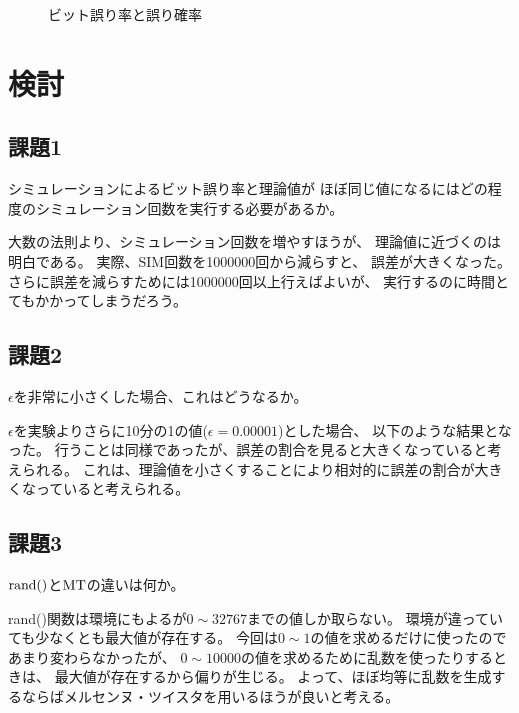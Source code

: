 \documentclass[12pt]{jarticle}
\begin{document}
\begin{figure}[h]
    \begin{center}
    \end{center}
    \caption{ビット誤り率と誤り確率}
\end{figure}

\section{検討}
\subsection{課題1}
\begin{shadebox}
    シミュレーションによるビット誤り率と理論値が
    ほぼ同じ値になるにはどの程度のシミュレーション回数を実行する必要があるか。
\end{shadebox}

大数の法則より、シミュレーション回数を増やすほうが、
理論値に近づくのは明白である。
実際、SIM回数を1000000回から減らすと、
誤差が大きくなった。
さらに誤差を減らすためには1000000回以上行えばよいが、
実行するのに時間とてもかかってしまうだろう。

\subsection{課題2}
\begin{shadebox}
    $\epsilon$を非常に小さくした場合、これはどうなるか。
\end{shadebox}

$\epsilon$を実験よりさらに10分の1の値($\epsilon=0.00001$)とした場合、
以下のような結果となった。
行うことは同様であったが、誤差の割合を見ると大きくなっていると考えられる。
これは、理論値を小さくすることにより相対的に誤差の割合が大きくなっていると考えられる。


\clearpage

\subsection{課題3}
\begin{shadebox}
    $\rm{rand()}$と$\rm{MT}$の違いは何か。
\end{shadebox}

rand()関数は環境にもよるが$0\sim 32767$までの値しか取らない。
環境が違っていても少なくとも最大値が存在する。
今回は$0\sim 1$の値を求めるだけに使ったのであまり変わらなかったが、
$0\sim 10000$の値を求めるために乱数を使ったりするときは、
最大値が存在するから偏りが生じる。
よって、ほぼ均等に乱数を生成するならばメルセンヌ・ツイスタを用いるほうが良いと考える。
\end{document}
